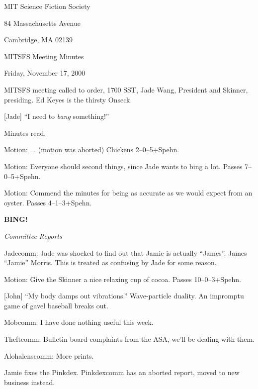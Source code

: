 \documentclass[12pt]{article}
\newcommand{\bing}{{\bf BING!} }
\newcommand{\goto}[1]{\bing \vskip 12pt \centerline{{\em{#1}}}}
\begin{document}
\begin{center}

MIT Science Fiction Society 

84 Massachusetts Avenue

Cambridge, MA 02139

\vspace{12pt}

MITSFS Meeting Minutes 

Friday, November 17, 2000

\end{center}
 
\vspace{18pt}

\setlength{\parskip}{6pt}

\noindent
MITSFS meeting called to order, 1700 SST, Jade Wang, President and
Skinner, presiding.  Ed Keyes is the thirsty Onseck.

[Jade] ``I need to {\em bang} something!''

Minutes read.

Motion: ... (motion was aborted)  Chickens 2--0--5+Spehn.

Motion: Everyone should second things, since Jade wants to bing a
lot.  Passes 7--0--5+Spehn.

Motion: Commend the minutes for being as accurate as we would expect
from an oyster.  Passes 4--1--3+Spehn.


\goto{Committee Reports}

Jadecomm: Jade was shocked to find out that Jamie is actually ``James''.
James ``Jamie'' Morris.  This is treated as confusing by Jade for some
reason.

Motion: Give the Skinner a nice relaxing cup of cocoa.  Passes
10--0--3+Spehn.

[John] ``My body damps out vibrations.''  Wave-particle duality.  An
impromptu game of gavel baseball breaks out.

Mobcomm: I have done nothing useful this week.

Theftcomm: Bulletin board complaints from the ASA, we'll be dealing
with them.

Alohalenscomm: More prints.

Jamie fixes the Pinkdex.  Pinkdexcomm has an aborted report, moved to
new business instead.
\end{document}
